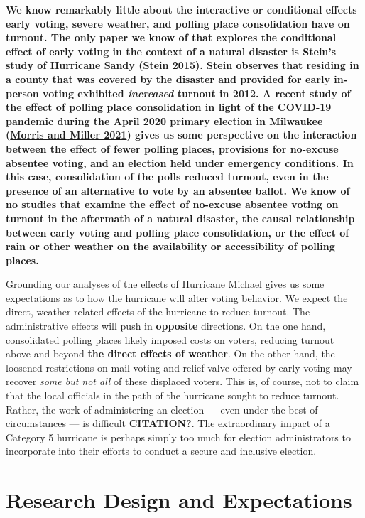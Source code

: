\documentclass[
  12pt,
]{article}
\begin{document}
\textbf{We know remarkably little about the interactive or conditional effects early voting, severe weather, and polling place consolidation have on turnout. The only paper we know of that explores the conditional effect of early voting in the context of a natural disaster is Stein's study of Hurricane Sandy (\protect\hyperlink{ref-Stein2015}{Stein 2015}). Stein observes that residing in a county that was covered by the disaster and provided for early in-person voting exhibited \emph{increased} turnout in 2012. A recent study of the effect of polling place consolidation in light of the COVID-19 pandemic during the April 2020 primary election in Milwaukee (\protect\hyperlink{ref-Morris2021}{Morris and Miller 2021}) gives us some perspective on the interaction between the effect of fewer polling places, provisions for no-excuse absentee voting, and an election held under emergency conditions. In this case, consolidation of the polls reduced turnout, even in the presence of an alternative to vote by an absentee ballot. We know of no studies that examine the effect of no-excuse absentee voting on turnout in the aftermath of a natural disaster, the causal relationship between early voting and polling place consolidation, or the effect of rain or other weather on the availability or accessibility of polling places.}

Grounding our analyses of the effects of Hurricane Michael gives us some expectations as to how the hurricane will alter voting behavior. We expect the direct, weather-related effects of the hurricane to reduce turnout. The administrative effects will push in \textbf{opposite} directions. On the one hand, consolidated polling places likely imposed costs on voters, reducing turnout above-and-beyond \textbf{the direct effects of weather}. On the other hand, the loosened restrictions on mail voting and relief valve offered by early voting may recover \emph{some but not all} of these displaced voters. This is, of course, not to claim that the local officials in the path of the hurricane sought to reduce turnout. Rather, the work of administering an election --- even under the best of circumstances --- is difficult \textbf{CITATION?}. The extraordinary impact of a Category 5 hurricane is perhaps simply too much for election administrators to incorporate into their efforts to conduct a secure and inclusive election.

\hypertarget{research-design-and-expectations}{%
\section*{Research Design and Expectations}\label{research-design-and-expectations}}
\end{document}
